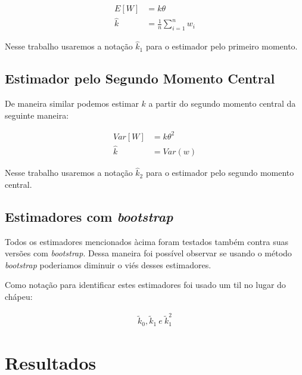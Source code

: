 \documentclass[12pt]{article}
\begin{document}
\begin{align}
  E[W] &= k\theta \\
  \hat{k} &= \frac{1}{n} \sum_{i=1}^nw_i 
\end{align}

  Nesse trabalho usaremos a notação $\hat{k}_1$ para o estimador pelo primeiro momento.

\subsection{Estimador pelo Segundo Momento Central}

De maneira similar podemos estimar $k$ a partir do segundo
momento central da seguinte maneira:

\begin{align}
  Var[W] &= k\theta^2 \\
  \hat{k} &= Var(w) 
\end{align}

  Nesse trabalho usaremos a notação $\hat{k}_2$ para o estimador pelo segundo momento central.

\subsection{Estimadores com \textit{bootstrap}}

Todos os estimadores mencionados àcima foram testados também contra
suas versões com \textit{bootstrap}. Dessa maneira foi possível
observar se usando o método \textit{bootstrap} poderiamos diminuir o
viés desses estimadores.

Como notação para identificar estes estimadores foi usado um til no
lugar do chápeu:

\begin{align*}
  \tilde{k}_0, \tilde{k}_1\ e\ \tilde{k}_1^2
\end{align*}





\section{Resultados}
\end{document}
